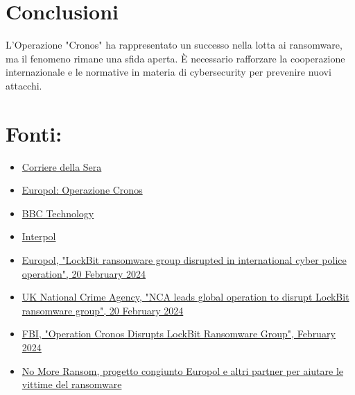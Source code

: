 \documentclass[a4paper,12pt]{article}
\begin{document}
\section{Conclusioni}
L'Operazione "Cronos" ha rappresentato un successo nella lotta ai ransomware, ma il fenomeno rimane una sfida aperta. È necessario rafforzare la cooperazione internazionale e le normative in materia di cybersecurity per prevenire nuovi attacchi.

\newpage
\section{Fonti:}
\begin{itemize}
    \item \href{https://www.corriere.it/tecnologia/23_dicembre_19/chi-sono-i-russi-di-lockbit-hacker-che-hanno-bloccato-la-pubblica-amministrazione-politica-contano-solo-i-soldi-695b2492-8908-4e12-993c-5cb23941dxlk.shtml}{Corriere della Sera}
    \item \href{https://www.europol.europa.eu/media-press/newsroom/news/lockbit-ransomware-group-disrupted-in-international-cyber-police-operation}{Europol: Operazione Cronos}
    \item \href{https://www.bbc.com/news/technology-68322223}{BBC Technology}
    \item \href{https://www.interpol.int/en/News-and-Events/News/2024/Global-Operation-Cronos-strikes-Lockbit}{Interpol}
     \item \href{https://www.europol.europa.eu/media-press/newsroom/news/lockbit-ransomware-group-disrupted-in-international-cyber-police-operation}{Europol, "LockBit ransomware group disrupted in international cyber police operation", 20 February 2024}
    \item \href{https://www.nca.gov.uk/news/nca-leads-global-operation-disrupt-lockbit-ransomware-group}{UK National Crime Agency, "NCA leads global operation to disrupt LockBit ransomware group", 20 February 2024}
    \item \href{https://www.fbi.gov/news/stories/lockbit-takedown-february-2024}{FBI, "Operation Cronos Disrupts LockBit Ransomware Group", February 2024}
    \item \href{https://www.nomoreransom.org/en/index.html}{No More Ransom, progetto congiunto Europol e altri partner per aiutare le vittime del ransomware}
\end{itemize}
\end{document}

